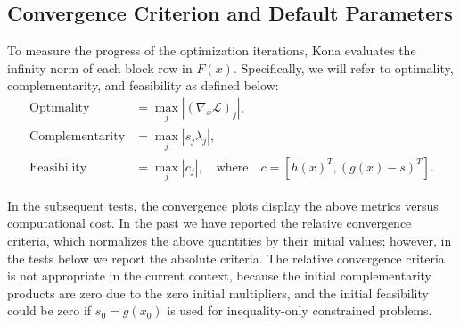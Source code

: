 
\subsection{Convergence Criterion and Default Parameters}
To measure the progress of the optimization iterations, Kona evaluates the infinity
norm of each block row in $F(x)$. Specifically, we will refer to optimality,
complementarity, and feasibility as defined below:
\begin{align*}\label{eq:optfeas}
\text{Optimality} &= \max_{j} | (\nabla_x \mathcal{L})_j |,  \\           %
\text{Complementarity} &= \max_{j} | s_j \lambda_j |,     \\            %
\text{Feasibility} &=  \max_{j} |   c_j     |  , \quad \text{where} \quad c = \left[ h(x)^T,  (g(x) - s)^T \right].         %
\end{align*}


In the subsequent tests, the convergence plots display the above metrics versus
computational cost.  In the past we have reported the relative convergence criteria, which normalizes the above quantities by their initial values; however, in the tests below we report the absolute criteria.
The relative convergence criteria is not appropriate in the current context, because the
 initial complementarity products are zero due to the zero initial multipliers, 
 and the initial feasibility could be zero if $s_0 = g(x_0)$ is used for inequality-only constrained problems. 

